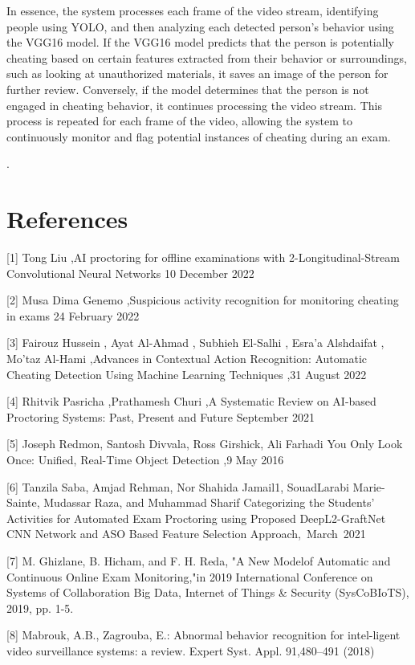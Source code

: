 \documentclass[conference]{IEEEtran}
\begin{document}
In essence, the system processes each frame of the video stream, identifying people using YOLO, and then analyzing each detected person's behavior using the VGG16 model. If the VGG16 model predicts that the person is potentially cheating based on certain features extracted from their behavior or surroundings, such as looking at unauthorized materials, it saves an image of the person for further review. Conversely, if the model determines that the person is not engaged in cheating behavior, it continues processing the video stream. This process is repeated for each frame of the video, allowing the system to continuously monitor and flag potential instances of cheating during an exam.

. 

\section*{References}
[1] Tong Liu ,AI proctoring for offline examinations with 2-Longitudinal-Stream
    Convolutional Neural Networks 10 December 2022
 
[2] Musa Dima Genemo ,Suspicious activity recognition for monitoring cheating in     exams 24 February 2022

[3] Fairouz Hussein , Ayat Al-Ahmad , Subhieh El-Salhi , Esra’a Alshdaifat ,         Mo’taz Al-Hami ,Advances in  Contextual Action Recognition: Automatic 
     Cheating Detection Using Machine Learning Techniques ,31 August 2022

[4] Rhitvik Pasricha ,Prathamesh Churi ,A Systematic Review on AI-based      
    Proctoring Systems: Past, Present  and Future September 2021
    
[5] Joseph Redmon, Santosh Divvala, Ross Girshick, Ali Farhadi You Only   
     Look Once: Unified, Real-Time Object Detection ,9 May 2016

[6] Tanzila Saba, Amjad Rehman, Nor Shahida Jamail1, SouadLarabi Marie-Sainte,
     Mudassar Raza, and Muhammad Sharif Categorizing the Students’ Activities for
     Automated Exam Proctoring using Proposed DeepL2-GraftNet CNN Network and ASO Based Feature Selection Approach, March 2021

[7]  M. Ghizlane, B. Hicham, and F. H. Reda, "A New Modelof Automatic and             Continuous Online Exam Monitoring,"in 2019 International Conference on 
     Systems of Collaboration Big Data, Internet of Things \& Security
    (SysCoBIoTS), 2019, pp. 1-5.

[8]  Mabrouk, A.B., Zagrouba, E.: Abnormal behavior recognition for 
    intel-ligent video surveillance systems: a review. Expert Syst. Appl.
     91,480–491 (2018)
\end{document}
